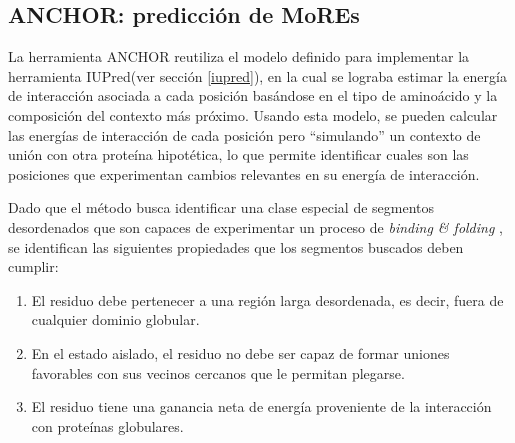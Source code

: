 \subsection{ANCHOR: predicción de MoREs} \label{anchor}

La herramienta ANCHOR\cite{meszaros2009prediction} reutiliza el modelo definido para implementar la herramienta IUPred(ver sección \ref{iupred}), en la cual se lograba estimar la energía de interacción asociada a cada posición basándose en 
el tipo de aminoácido y la composición del contexto más próximo. Usando esta modelo, se pueden calcular las energías de interacción de cada posición pero ``simulando'' un contexto de unión con otra proteína hipotética, lo que permite
identificar cuales son las posiciones que experimentan cambios relevantes en su energía de interacción. 

Dado que el método busca identificar una clase especial de segmentos desordenados que son capaces de experimentar un proceso de \textit{binding \& folding}   , 
se identifican las siguientes propiedades que los segmentos buscados deben cumplir:
\begin{enumerate}
 \item El residuo debe pertenecer a una región larga desordenada, es decir, fuera de cualquier dominio globular.
 \item En el estado aislado, el residuo no debe ser capaz de formar uniones favorables con sus vecinos cercanos que le permitan plegarse.
 \item El residuo tiene una ganancia neta de energía proveniente de la interacción con proteínas globulares.
 \end{enumerate}

